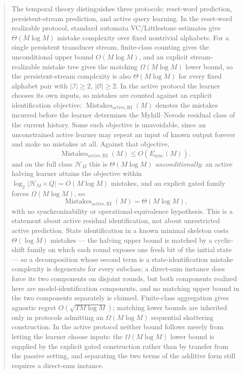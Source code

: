 \documentclass[12pt]{article}
\theoremstyle{definition}
\newcommand{\Esync}{E_{\mathrm{sync}}}
\newcommand{\MistRI}{\operatorname{Mistakes}_{\mathrm{active,RI}}}
\begin{document}
\begin{abstract}
The temporal theory distinguishes three protocols: reset-word prediction,
persistent-stream prediction, and active query learning.  In the reset-word
realizable protocol, standard automata VC/Littlestone estimates give
$\Theta(M\log M)$ mistake complexity over fixed nontrivial alphabets.  For a
single persistent transducer stream, finite-class counting gives the
unconditional upper bound $O(M\log M)$, and an explicit stream-realizable
mistake tree gives the matching $\Omega(M\log M)$ lower bound, so the
persistent-stream complexity is also $\Theta(M\log M)$ for every fixed
alphabet pair with $|\mathcal I|\ge2$, $|\mathcal O|\ge2$.  In the active protocol the learner chooses its own inputs, so mistakes are
counted against an explicit identification objective: $\MistRI(M)$ denotes the
mistakes incurred before the learner determines the Myhill--Nerode residual
class of the current history.  Some such objective is unavoidable, since an
unconstrained active learner may repeat an input of known output forever and
make no mistakes at all.  Against that objective,
\[
\MistRI(M)
\le
O(\Esync(M)),
\]
and on the full class $\mathcal H_M$ this is $\Theta(M\log M)$
\emph{unconditionally}: an active halving learner attains the objective within
$\log_2|\mathcal H_M\times Q|=O(M\log M)$ mistakes, and an explicit gated
family forces $\Omega(M\log M)$, so
\[
\MistRI(M)
=
\Theta(M\log M),
\]
with no synchronizability or operational-equivalence hypothesis.  This is a
statement about active residual identification, not about unrestricted active
prediction.
State identification in a known minimal skeleton costs
$\Theta(\log M)$ mistakes --- the halving upper bound is matched
by a cyclic-shift family on which each round exposes one fresh bit of the
initial state --- so a decomposition whose second term is a
state-identification mistake complexity is degenerate for every subclass; a
direct-sum instance does force its two components on disjoint rounds, but both
components realized here are model-identification components, and no matching
upper bound in the two components separately is claimed.
Finite-class aggregation gives agnostic regret $O(\sqrt{T M\log M})$; matching
lower bounds are inherited only in protocols admitting an $\Omega(M\log M)$
sequential shattering construction.  In the active protocol neither bound
follows merely from letting the learner choose inputs: the $\Omega(M\log M)$
lower bound is supplied by the explicit gated construction rather than by
transfer from the passive setting, and separating the two terms of the additive
form still requires a direct-sum instance.


\end{abstract}
\end{document}

